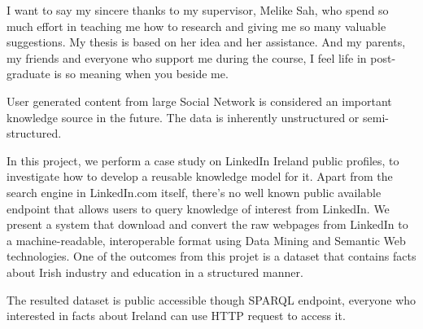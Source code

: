 \documentclass[a4paper, 12pt, oneside]{report}         %
\begin{document}

\thesistitlepage                                  %

\thesisdeclarationpage				  %

\thesispermissionpage				  %


\begin{thesisacknowledgments}                     %

I want to say my sincere thanks to my supervisor, Melike Sah, who spend so much effort in teaching me how to research and giving me so many valuable suggestions. My thesis is based on her idea and her assistance. And my parents, my friends and everyone who support me during the course, I feel life in post-graduate is so meaning when you beside me.

\end{thesisacknowledgments}                       %

\begin{thesisabstract}

User generated content from large Social Network is considered an important knowledge source in the future. The data is inherently unstructured or semi-structured. 

In this project, we perform a case study on LinkedIn Ireland public profiles, to investigate how to develop a reusable knowledge model for it. Apart from the search engine in LinkedIn.com itself, there's no well known public available endpoint that allows users to query knowledge of interest from LinkedIn. We present a system that download and convert the raw webpages from LinkedIn to a machine-readable,  interoperable format using Data Mining and Semantic Web technologies. One of the outcomes from this projet is a dataset that contains facts about Irish industry and education in a structured manner.

The resulted dataset is public accessible though SPARQL endpoint, everyone who interested in facts about Ireland can use HTTP request to access it.

\end{thesisabstract}
\end{document}
